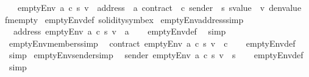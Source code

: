 \begin{isabellebody}
\ \ \ {\isachardoublequoteopen}emptyEnv\ a\ c\ s\ v\ {\isacharequal}{\kern0pt}\ {\isasymlparr}address\ {\isacharequal}{\kern0pt}\ a{\isacharcomma}{\kern0pt}\ contract\ {\isacharequal}{\kern0pt}\ c{\isacharcomma}{\kern0pt}\ sender\ {\isacharequal}{\kern0pt}\ s{\isacharcomma}{\kern0pt}\ svalue\ {\isacharequal}{\kern0pt}\ v{\isacharcomma}{\kern0pt}\ denvalue\ {\isacharequal}{\kern0pt}\ fmempty{\isasymrparr}{\isachardoublequoteclose}\isanewline
\isanewline
{}\isamarkupfalse%
\ emptyEnv{\isacharunderscore}{\kern0pt}def\ {\isacharbrackleft}{\kern0pt}solidity{\isacharunderscore}{\kern0pt}symbex{\isacharbrackright}{\kern0pt}\isanewline
\isanewline
{}\isamarkupfalse%
\ emptyEnv{\isacharunderscore}{\kern0pt}address{\isacharbrackleft}{\kern0pt}simp{\isacharbrackright}{\kern0pt}{\isacharcolon}{\kern0pt}\isanewline
\ \ {\isachardoublequoteopen}address\ {\isacharparenleft}{\kern0pt}emptyEnv\ a\ c\ s\ v{\isacharparenright}{\kern0pt}\ {\isacharequal}{\kern0pt}\ a{\isachardoublequoteclose}\isanewline
%
\isadelimproof
\ \ %
\endisadelimproof
%
\isatagproof
{}\isamarkupfalse%
\ emptyEnv{\isacharunderscore}{\kern0pt}def\ \isamarkupfalse%
\ simp%
\endisatagproof
{\isafoldproof}%
%
\isadelimproof
\isanewline
%
\endisadelimproof
\isanewline
{}\isamarkupfalse%
\ emptyEnv{\isacharunderscore}{\kern0pt}members{\isacharbrackleft}{\kern0pt}simp{\isacharbrackright}{\kern0pt}{\isacharcolon}{\kern0pt}\isanewline
\ \ {\isachardoublequoteopen}contract\ {\isacharparenleft}{\kern0pt}emptyEnv\ a\ c\ s\ v{\isacharparenright}{\kern0pt}\ {\isacharequal}{\kern0pt}\ c{\isachardoublequoteclose}\isanewline
%
\isadelimproof
\ \ %
\endisadelimproof
%
\isatagproof
{}\isamarkupfalse%
\ emptyEnv{\isacharunderscore}{\kern0pt}def\ \isamarkupfalse%
\ simp%
\endisatagproof
{\isafoldproof}%
%
\isadelimproof
\isanewline
%
\endisadelimproof
\isanewline
{}\isamarkupfalse%
\ emptyEnv{\isacharunderscore}{\kern0pt}sender{\isacharbrackleft}{\kern0pt}simp{\isacharbrackright}{\kern0pt}{\isacharcolon}{\kern0pt}\isanewline
\ \ {\isachardoublequoteopen}sender\ {\isacharparenleft}{\kern0pt}emptyEnv\ a\ c\ s\ v{\isacharparenright}{\kern0pt}\ {\isacharequal}{\kern0pt}\ s{\isachardoublequoteclose}\isanewline
%
\isadelimproof
\ \ %
\endisadelimproof
%
\isatagproof
{}\isamarkupfalse%
\ emptyEnv{\isacharunderscore}{\kern0pt}def\ \isamarkupfalse%
\ simp%
\endisatagproof
{\isafoldproof}%
%
\isadelimproof
\isanewline
%
\endisadelimproof
\isanewline

\end{isabellebody}
